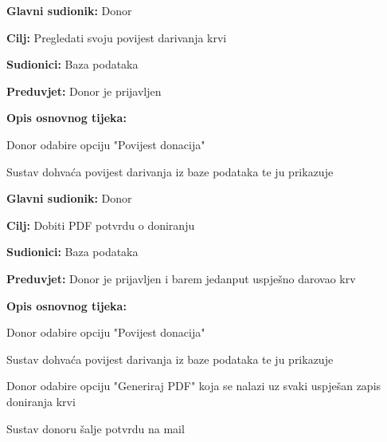 \noindent {}
					\begin{packed_item}
	
						\item \textbf{Glavni sudionik: }Donor
						\item \textbf{Cilj:} Pregledati svoju povijest darivanja krvi
						\item \textbf{Sudionici:} Baza podataka
						\item \textbf{Preduvjet:} Donor je prijavljen
						\item \textbf{Opis osnovnog tijeka:}
						
						\item[] \begin{packed_enum}
	
							\item Donor odabire opciju "Povijest donacija"
							\item Sustav dohvaća povijest darivanja iz baze podataka te ju prikazuje
							
						\end{packed_enum}

					\end{packed_item}
\eject 
\noindent {}
					\begin{packed_item}
	
						\item \textbf{Glavni sudionik:} Donor
						\item \textbf{Cilj:} Dobiti PDF potvrdu o doniranju
						\item \textbf{Sudionici:} Baza podataka
						\item \textbf{Preduvjet:} Donor je prijavljen i barem jedanput uspješno darovao krv
						\item \textbf{Opis osnovnog tijeka:}
						
						\item[] \begin{packed_enum}
	
							\item Donor odabire opciju "Povijest donacija"
							\item Sustav dohvaća povijest darivanja iz baze podataka te ju prikazuje
							\item Donor odabire opciju "Generiraj PDF" koja se nalazi uz svaki uspješan zapis doniranja krvi
							\item Sustav donoru šalje potvrdu na mail
							
						\end{packed_enum}

					\end{packed_item}

